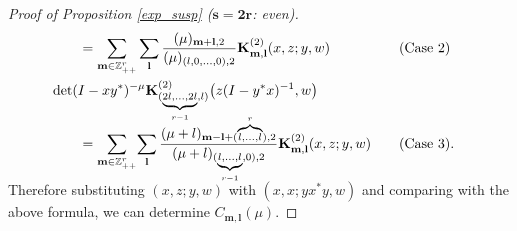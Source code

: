 \documentclass[pdftex]{sigma}
\numberwithin{equation}{section}
\newcommand{\bK}{\mathbf{K}}
\newcommand{\bl}{\mathbf{l}}
\newcommand{\bm}{\mathbf{m}}
\newcommand{\BZ}{\mathbb{Z}}
\begin{document}
\begin{proof}[Proof of Proposition \ref{exp_susp} ($\boldsymbol{s=2r}$: even)]
\begin{alignat*}{3}
&\qquad {} =\sum_{\bm\in\BZ_{++}^r}\sum_\bl \frac{(\mu)_{\bm+\bl,2}}{(\mu)_{(l,0,\ldots,0),2}}\bK_{\bm,\bl}^{(2)}(x,z;y,w) \quad&& (\text{Case }2)& \\
& \det(I-xy^*)^{-\mu}\bK_{(\smash{\underbrace{\scriptstyle 2l,\ldots,2l}_{r-1}},l)}^{(2)}\big(z(I-y^*x)^{-1},w\big)&&&\\[5mm]
& \qquad {} = \sum_{\bm\in\BZ_{++}^r}\!\sum_\bl \frac{(\mu+l)_{\bm-\bl+(\smash{\overbrace{\scriptstyle l,\ldots,l}^r}),2}}
{(\mu+l)_{(\smash{\underbrace{\scriptstyle l,\ldots,l}_{r-1}},0),2}}\bK_{\bm,\bl}^{(2)}(x,z;y,w) \quad&& (\text{Case }3).&
\end{alignat*}
Therefore substituting $(x,z;y,w)$ with $(x,x;yx^*y,w)$ and comparing with the above formula, we can determine $C_{\bm,\bl}(\mu)$.
\end{proof}
\end{document}
